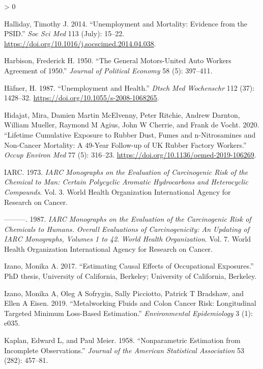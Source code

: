 \documentclass[
  11pt,
]{article}
\newlength{\cslhangindent}
\newenvironment{CSLReferences}[2] %
 {%
  \setlength{\parindent}{0pt}
  \ifodd #1 \everypar{\setlength{\hangindent}{\cslhangindent}}\ignorespaces\fi
  \ifnum #2 > 0
  \setlength{\parskip}{#2\baselineskip}
  \fi
 }%
 {}
\begin{document}
\begin{CSLReferences}{1}{0}
\leavevmode\hypertarget{ref-Halliday_2014}{}%
Halliday, Timothy J. 2014. {``Unemployment and Mortality: Evidence from
the PSID.''} \emph{Soc Sci Med} 113 (July): 15--22.
\url{https://doi.org/10.1016/j.socscimed.2014.04.038}.

\leavevmode\hypertarget{ref-Harbison_1950}{}%
Harbison, Frederick H. 1950. {``The General Motors-United Auto Workers
Agreement of 1950.''} \emph{Journal of Political Economy} 58 (5):
397--411.

\leavevmode\hypertarget{ref-Hafner_1987}{}%
Häfner, H. 1987. {``Unemployment and Health.''} \emph{Dtsch Med
Wochenschr} 112 (37): 1428--32.
\url{https://doi.org/10.1055/s-2008-1068265}.

\leavevmode\hypertarget{ref-Hidajat_2020}{}%
Hidajat, Mira, Damien Martin McElvenny, Peter Ritchie, Andrew Darnton,
William Mueller, Raymond M Agius, John W Cherrie, and Frank de Vocht.
2020. {``Lifetime Cumulative Exposure to Rubber Dust, Fumes and
n-Nitrosamines and Non-Cancer Mortality: A 49-Year Follow-up of UK
Rubber Factory Workers.''} \emph{Occup Environ Med} 77 (5): 316--23.
\url{https://doi.org/10.1136/oemed-2019-106269}.

\leavevmode\hypertarget{ref-IARC_1973}{}%
IARC. 1973. \emph{IARC Monographs on the Evaluation of Carcinogenic Risk
of the Chemical to Man: Certain Polycyclic Aromatic Hydrocarbons and
Heterocyclic Compounds}. Vol. 3. World Health Organization International
Agency for Research on Cancer.

\leavevmode\hypertarget{ref-IARC_1987}{}%
---------. 1987. \emph{IARC Monographs on the Evaluation of the
Carcinogenic Risk of Chemicals to Humans. Overall Evaluations of
Carcinogenicity: An Updating of IARC Monographs, Volumes 1 to 42}.
\emph{World Health Organization}. Vol. 7. World Health Organization
International Agency for Research on Cancer.

\leavevmode\hypertarget{ref-Izano_2017_thesis}{}%
Izano, Monika A. 2017. {``Estimating Causal Effects of Occupational
Exposures.''} PhD thesis, University of California, Berkeley; University
of California, Berkeley.

\leavevmode\hypertarget{ref-Izano_2019}{}%
Izano, Monika A, Oleg A Sofrygin, Sally Picciotto, Patrick T Bradshaw,
and Ellen A Eisen. 2019. {``Metalworking Fluids and Colon Cancer Risk:
Longitudinal Targeted Minimum Loss-Based Estimation.''}
\emph{Environmental Epidemiology} 3 (1): e035.

\leavevmode\hypertarget{ref-Kaplan_1958}{}%
Kaplan, Edward L, and Paul Meier. 1958. {``Nonparametric Estimation from
Incomplete Observations.''} \emph{Journal of the American Statistical
Association} 53 (282): 457--81.


\end{CSLReferences}
\end{document}
